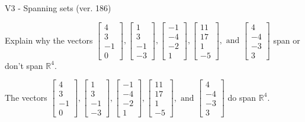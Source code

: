 \begin{exercise}
  \begin{exerciseTitle}V3 - Spanning sets (ver. 186)\end{exerciseTitle}
  \begin{exerciseStatement}
    Explain why the vectors \(\left[\begin{array}{r}
4 \\
3 \\
-1 \\
0
\end{array}\right] , \left[\begin{array}{r}
1 \\
3 \\
-1 \\
-3
\end{array}\right] , \left[\begin{array}{r}
-1 \\
-4 \\
-2 \\
1
\end{array}\right] , \left[\begin{array}{r}
11 \\
17 \\
1 \\
-5
\end{array}\right] , \text{ and } \left[\begin{array}{r}
4 \\
-4 \\
-3 \\
3
\end{array}\right]\) span or don't span \(\mathbb{R}^4\). 
	


  \end{exerciseStatement}
  \begin{exerciseAnswer}
   The vectors \(\left[\begin{array}{r}
4 \\
3 \\
-1 \\
0
\end{array}\right] , \left[\begin{array}{r}
1 \\
3 \\
-1 \\
-3
\end{array}\right] , \left[\begin{array}{r}
-1 \\
-4 \\
-2 \\
1
\end{array}\right] , \left[\begin{array}{r}
11 \\
17 \\
1 \\
-5
\end{array}\right] , \text{ and } \left[\begin{array}{r}
4 \\
-4 \\
-3 \\
3
\end{array}\right]\) 
  	 do  
	span \(\mathbb{R}^4\).
  



\end{exerciseAnswer}
\end{exercise}
